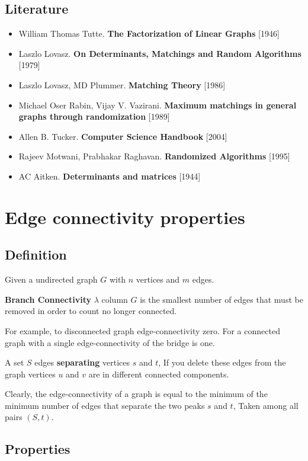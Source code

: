 \subsection{ Literature }

\begin{itemize} \item William Thomas Tutte. \textbf{The Factorization of Linear Graphs} [1946] \item Laszlo Lovasz. \textbf{On Determinants, Matchings and Random Algorithms} [1979] \item Laszlo Lovasz, MD Plummer. \textbf{Matching Theory} [1986] \item Michael Oser Rabin, Vijay V. Vazirani. \textbf{Maximum matchings in general graphs through randomization} [1989] \item Allen B. Tucker. \textbf{Computer Science Handbook} [2004] \item Rajeev Motwani, Prabhakar Raghavan. \textbf{Randomized Algorithms} [1995] \item AC Aitken. \textbf{Determinants and matrices} [1944] \end{itemize}

\section{ Edge connectivity properties }
\subsection{ Definition }

Given a undirected graph $G$ with $n$ vertices and $m$ edges.

\textbf{Branch Connectivity} $\lambda$ column $G$ is the smallest number of edges that must be removed in order to count no longer connected.

For example, to disconnected graph edge-connectivity zero. For a connected graph with a single edge-connectivity of the bridge is one.

A set $S$ edges \textbf{separating} vertices $s$ and $t$, If you delete these edges from the graph vertices $u$ and $v$ are in different connected components.

Clearly, the edge-connectivity of a graph is equal to the minimum of the minimum number of edges that separate the two peaks $s$ and $t$, Taken among all pairs $(S, t)$.

\subsection{ Properties }


